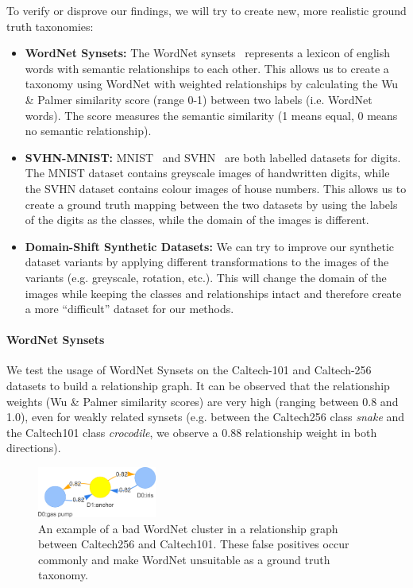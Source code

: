 To verify or disprove our findings, we will try to create new, more realistic ground truth taxonomies:
\begin{itemize}
      \item \textbf{WordNet Synsets:} The WordNet synsets~\cite{fellbaum_wordnet_1998,noauthor_wordnet_nodate}
            represents a lexicon of english words with semantic relationships to each other.
            This allows us to create a taxonomy using WordNet with weighted relationships by calculating
            the Wu \& Palmer similarity score (range 0-1) between two labels (i.e. WordNet words).
            The score measures the semantic similarity (1 means equal, 0 means no semantic relationship).
      \item \textbf{SVHN-MNIST:} MNIST~\cite{deng_mnist_2012} and SVHN~\cite{netzer_reading_2011} are both labelled datasets
            for digits. The MNIST dataset contains greyscale images of handwritten digits,
            while the SVHN dataset contains colour images of house numbers.
            This allows us to create a ground truth mapping between the two datasets
            by using the labels of the digits as the classes, while the domain of the images
            is different.
      \item \textbf{Domain-Shift Synthetic Datasets:} We can try to improve our synthetic dataset variants
            by applying different transformations to the images of the variants (e.g. greyscale, rotation, etc.).
            This will change the domain of the images while keeping the classes and relationships intact
            and therefore create a more \enquote{difficult} dataset for our methods.
\end{itemize}

\paragraph{WordNet Synsets}

We test the usage of WordNet Synsets on the Caltech-101 and Caltech-256 datasets to build a relationship graph.
It can be observed that the relationship weights (Wu \& Palmer similarity scores) are very high (ranging between 0.8 and 1.0),
even for weakly related synsets (e.g. between the Caltech256 class \textit{snake} and the Caltech101 class \textit{crocodile},
we observe a 0.88 relationship weight in both directions).

\begin{figure}[ht]
      \centering
      \includegraphics[width=0.35\textwidth]{figures/wordnet.png}

      \caption{An example of a bad WordNet cluster in a relationship graph between Caltech256 and Caltech101.
            These false positives occur commonly and make WordNet unsuitable as a ground truth taxonomy.}
      \label{fig:wordnet}
\end{figure}


